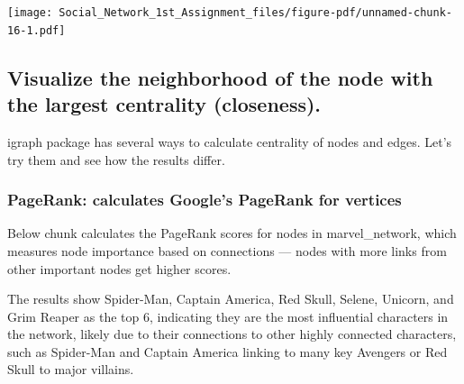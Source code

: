 \documentclass[
  letterpaper,
  DIV=11,
  numbers=noendperiod]{scrartcl}
\newenvironment{Shaded}{\begin{snugshade}}{\end{snugshade}}
\newcommand{\AttributeTok}[1]{\textcolor[rgb]{0.40,0.45,0.13}{#1}}
\newcommand{\CommentTok}[1]{\textcolor[rgb]{0.37,0.37,0.37}{#1}}
\newcommand{\ConstantTok}[1]{\textcolor[rgb]{0.56,0.35,0.01}{#1}}
\newcommand{\FunctionTok}[1]{\textcolor[rgb]{0.28,0.35,0.67}{#1}}
\newcommand{\NormalTok}[1]{\textcolor[rgb]{0.00,0.23,0.31}{#1}}
\newcommand{\OtherTok}[1]{\textcolor[rgb]{0.00,0.23,0.31}{#1}}
\newcommand{\SpecialCharTok}[1]{\textcolor[rgb]{0.37,0.37,0.37}{#1}}
\begin{document}
\texttt{[image: Social\_Network\_1st\_Assignment\_files/figure-pdf/unnamed-chunk-16-1.pdf]}

\subsection{Visualize the neighborhood of the node with the largest
centrality
(closeness).}\label{visualize-the-neighborhood-of-the-node-with-the-largest-centrality-closeness.}

igraph package has several ways to calculate centrality of nodes and
edges. Let's try them and see how the results differ.

\subsubsection{PageRank: calculates Google's PageRank for
vertices}\label{pagerank-calculates-googles-pagerank-for-vertices}

Below chunk calculates the PageRank scores for nodes in marvel\_network,
which measures node importance based on connections --- nodes with more
links from other important nodes get higher scores.

The results show Spider-Man, Captain America, Red Skull, Selene,
Unicorn, and Grim Reaper as the top 6, indicating they are the most
influential characters in the network, likely due to their connections
to other highly connected characters, such as Spider-Man and Captain
America linking to many key Avengers or Red Skull to major villains.

\begin{Shaded}
\end{Shaded}
\end{document}
